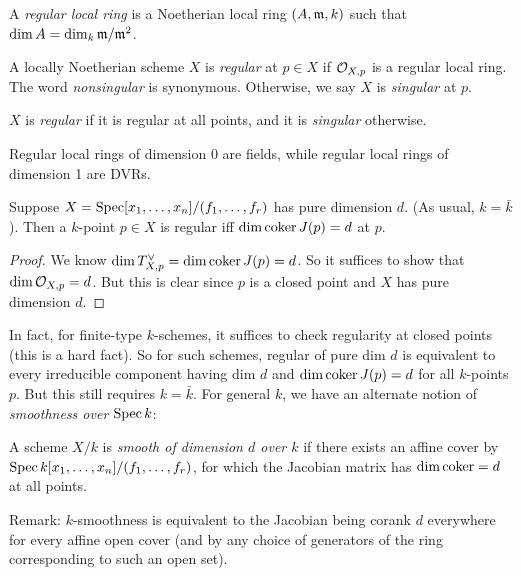 \documentclass[11pt]{amsart}
\begin{document}
\begin{defn}
    A \emph{regular local ring} is a Noetherian local ring $(A,\mathfrak{m},k)$ such that $\dim A = \dim_k \mathfrak{m}/\mathfrak{m}^2$.
\end{defn}

\begin{defn}[regularity]
    A locally Noetherian scheme $X$ is \emph{regular} at $p\in X$ if $\mathcal{O}_{X,p}$ is a regular local ring. The word \emph{nonsingular} is synonymous. Otherwise, we say $X$ is \emph{singular} at $p$.

    $X$ is \emph{regular} if it is regular at all points, and it is \emph{singular} otherwise.
\end{defn}

\begin{exm}
    Regular local rings of dimension 0 are fields, while regular local rings of dimension 1 are DVRs.
\end{exm}

\begin{prop}
    Suppose $X = \operatorname{Spec}[x_1,\dots,x_n]/(f_1,\dots,f_r)$ has pure dimension $d$. (As usual, $k = \bar{k}$). Then a $k$-point $p\in X$ is regular iff $\dim \operatorname{coker} J(p) = d$ at $p$. 
\end{prop}

\begin{proof}
    We know $\dim T_{X,p}^{\vee} = \dim \operatorname{coker} J(p) = d$. So it suffices to show that $\dim \mathcal{O}_{X,p} = d$. But this is clear since $p$ is a closed point and $X$ has pure dimension $d$.
\end{proof}

In fact, for finite-type $k$-schemes, it suffices to check regularity at closed points (this is a hard fact). So for such schemes, regular of pure dim $d$ is equivalent to every irreducible component having dim $d$ and $\dim \operatorname{coker} J(p) = d$ for all $k$-points $p$. But this still requires $k = \bar{k}$. For general $k$, we have an alternate notion of \emph{smoothness over} $\operatorname{Spec} k$:


\begin{defn}
    A scheme $X/k$ is \emph{smooth of dimension $d$ over $k$} if there exists an affine cover by $\operatorname{Spec} k[x_1,\dots,x_n]/(f_1,\dots,f_r)$, for which the Jacobian matrix has $\dim \operatorname{coker} = d$ at all points.
\end{defn}

Remark: $k$-smoothness is equivalent to the Jacobian being corank $d$ everywhere for every affine open cover (and by any choice of generators of the ring corresponding to such an open set).
\end{document}
